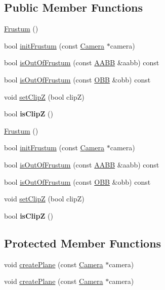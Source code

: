 \subsection*{Public Member Functions}
\begin{DoxyCompactItemize}
\item 
\hyperlink{classFrustum_a172ae3492592e3ac891642299d628494}{Frustum} ()
\item 
bool \hyperlink{classFrustum_a763ea95a5a61afb4ea0d0396fd49ab33}{init\+Frustum} (const \hyperlink{classCamera}{Camera} $\ast$camera)
\item 
bool \hyperlink{classFrustum_a618fd2d27f0337512ca1b1aeee8580e1}{is\+Out\+Of\+Frustum} (const \hyperlink{classAABB}{A\+A\+BB} \&aabb) const
\item 
bool \hyperlink{classFrustum_ae9285dfe28bfbf7d6439cddcec8d06cb}{is\+Out\+Of\+Frustum} (const \hyperlink{classOBB}{O\+BB} \&obb) const
\item 
void \hyperlink{classFrustum_aeaee893e649086140744a814e62f5701}{set\+ClipZ} (bool clipZ)
\item 
\mbox{\label{classFrustum_a7247825c3a1f8f4aa34de56e0c74aeb3}} 
bool {\bfseries is\+ClipZ} ()
\item 
\hyperlink{classFrustum_a172ae3492592e3ac891642299d628494}{Frustum} ()
\item 
bool \hyperlink{classFrustum_a3dda1026433e9335df72c7ce893cc5c6}{init\+Frustum} (const \hyperlink{classCamera}{Camera} $\ast$camera)
\item 
bool \hyperlink{classFrustum_a618fd2d27f0337512ca1b1aeee8580e1}{is\+Out\+Of\+Frustum} (const \hyperlink{classAABB}{A\+A\+BB} \&aabb) const
\item 
bool \hyperlink{classFrustum_ae9285dfe28bfbf7d6439cddcec8d06cb}{is\+Out\+Of\+Frustum} (const \hyperlink{classOBB}{O\+BB} \&obb) const
\item 
void \hyperlink{classFrustum_aeaee893e649086140744a814e62f5701}{set\+ClipZ} (bool clipZ)
\item 
\mbox{\label{classFrustum_a7247825c3a1f8f4aa34de56e0c74aeb3}} 
bool {\bfseries is\+ClipZ} ()
\end{DoxyCompactItemize}
\subsection*{Protected Member Functions}
\begin{DoxyCompactItemize}
\item 
void \hyperlink{classFrustum_a3b271a1a0fcce5eeaca0ec684fe02f7b}{create\+Plane} (const \hyperlink{classCamera}{Camera} $\ast$camera)
\item 
void \hyperlink{classFrustum_a3b271a1a0fcce5eeaca0ec684fe02f7b}{create\+Plane} (const \hyperlink{classCamera}{Camera} $\ast$camera)
\end{DoxyCompactItemize}
